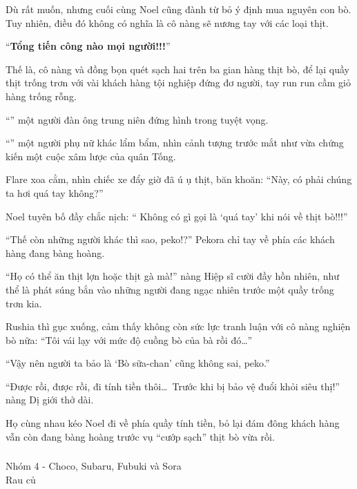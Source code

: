 \documentclass[../main.tex]{subfiles}
\begin{document}
Dù rất muốn, nhưng cuối cùng Noel cũng đành từ bỏ ý định mua nguyên con bò. Tuy nhiên, điều đó không có nghĩa là cô nàng sẽ nương tay với các loại thịt.

``\textbf{Tổng tiến công nào mọi người!!!}''

Thế là, cô nàng và đồng bọn quét sạch hai trên ba gian hàng thịt bò, để lại quầy thịt trống trơn với vài khách hàng tội nghiệp đứng đơ người, tay run run cầm giỏ hàng trống rỗng.

``'' một người đàn ông trung niên đứng hình trong tuyệt vọng.

``'' một người phụ nữ khác lẩm bẩm,  nhìn cảnh tượng trước mắt như vừa chứng kiến một cuộc xâm lược của quân Tống.

Flare xoa cằm, nhìn chiếc xe đẩy giờ đã ú ụ thịt, băn khoăn: ``Này, có phải chúng ta hơi quá tay không?''

Noel tuyên bố đầy chắc nịch: `` Không có gì gọi là `quá tay' khi nói về thịt bò!!!''

``Thế còn những người khác thì sao, peko!?'' Pekora chỉ tay về phía các khách hàng đang bàng hoàng.

``Họ có thể ăn thịt lợn hoặc thịt gà mà!'' nàng Hiệp sĩ cười đầy hồn nhiên, như thể là phát súng bắn vào những người đang ngạc nhiên trước một quầy trống trơn kia.

Rushia thì gục xuống, cảm thấy không còn sức lực tranh luận với cô nàng nghiện bò nữa: ``Tôi vái lạy với mức độ cuồng bò của bà rồi đó\dots''

``Vậy nên người ta bảo là `Bò sữa-chan' cũng không sai, peko.''

``Được rồi, được rồi, đi tính tiền thôi\dots\ Trước khi bị bảo vệ đuổi khỏi siêu thị!'' nàng Dị giới thở dài.

Họ cùng nhau kéo Noel đi về phía quầy tính tiền, bỏ lại đám đông khách hàng vẫn còn đang bàng hoàng trước vụ ``cướp sạch'' thịt bò vừa rồi.

\vspace{-40pt}
\subsubsection*{\label{P1.1d}}

\begin{center}
    {\color{T4} Nhóm 4 - Choco, Subaru, Fubuki và Sora\\Rau củ}
\end{center}
\end{document}
